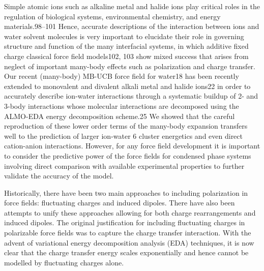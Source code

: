 \documentclass[journal=jacsat,manuscript=article]{achemso}
\begin{document}
 Simple atomic ions such as alkaline metal and halide ions play critical roles in the regulation of biological systems, environmental chemistry, and energy materials.98–101 Hence, accurate descriptions of the interaction between ions and water solvent molecules is very important to elucidate their role in governing structure and function of the many interfacial systems, in which additive fixed charge classical force field models102, 103 show mixed success that arises from neglect of important many-body effects such as polarization and charge transfer. Our recent (many-body) MB-UCB force field for water18 has been recently extended to monovalent and divalent alkali metal and halide ions22 in order to accurately describe ion-water interactions through a systematic buildup of 2- and 3-body interactions whose molecular interactions are decomposed using the ALMO-EDA energy decomposition scheme.25 We showed that the careful reproduction of these lower order terms of the many-body expansion transfers well to the prediction of larger ion-water 6 cluster energetics and even direct cation-anion interactions. However, for any force field development it is important to consider the predictive power of the force fields for condensed phase systems involving direct comparison with available experimental properties to further validate the accuracy of the model.


 Historically, there have been two main approaches to including polarization in force fields: fluctuating charges\cite{rick1994dynamical} and induced dipoles\cite{applequist1985multipole}. There have also been attempts to unify these approaches allowing for both charge rearrangements and induced dipoles.\cite{stern2001combined} The original justification for including fluctuating charges in polarizable force fields was to capture the charge transfer interaction.\cite{rick1994dynamical} With the advent of variational energy decomposition analysis (EDA) techniques\cite{horn2016probing,mao2021intermolecular}, it is now clear that the charge transfer energy scales exponentially and hence cannot be modelled by fluctuating charges alone.
\end{document}
